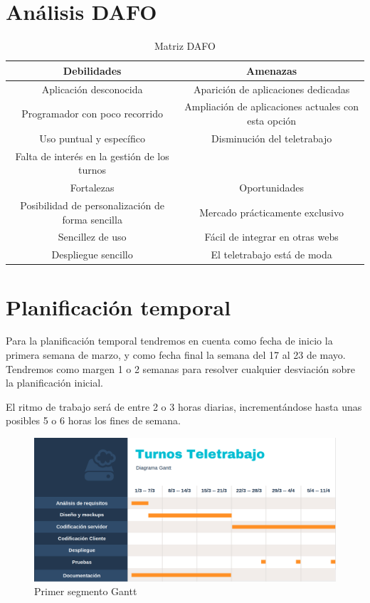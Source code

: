 \documentclass[11pt,spanish,listoffigures,listoftables]{tfgetsinf}
\begin{document}
\section{Análisis DAFO}
\begin{table} 
\begin{center}
\begin{tabular}{| c | c |}
\hline
Debilidades & Amenazas \\ \hline
\tiny Aplicación desconocida & \tiny Aparición de aplicaciones dedicadas \\
\tiny Programador con poco recorrido & \tiny Ampliación de aplicaciones actuales con esta opción \\
\tiny Uso puntual y específico & \tiny Disminución del teletrabajo\\
\tiny Falta de interés en la gestión de los turnos &  \\ \hline   
\normalsize
Fortalezas & Oportunidades \\ \hline
\tiny Posibilidad de personalización de forma sencilla & \tiny Mercado prácticamente exclusivo \\
\tiny Sencillez de uso &  \tiny Fácil de integrar en otras webs\\
\tiny Despliegue sencillo & \tiny El teletrabajo está de moda \\
\hline
\end{tabular}
\caption{Matriz DAFO}
\label{table:1}
\end{center}
\end{table}
\section{Planificación temporal}
Para la planificación temporal tendremos en cuenta como fecha de inicio la primera semana de marzo, y como fecha final la semana del 17 al 23 de mayo.
Tendremos como margen 1 o 2 semanas para resolver cualquier desviación sobre la planificación inicial.

El ritmo de trabajo será de entre 2 o 3 horas diarias, incrementándose hasta unas posibles 5 o 6 horas los fines de semana. 

\begin{figure}[h!] %
   \includegraphics[width=\linewidth]{img/gantt1.png}
   \caption{Primer segmento Gantt}
   \label{fig:Gantt1}
 \end{figure}
\end{document}
